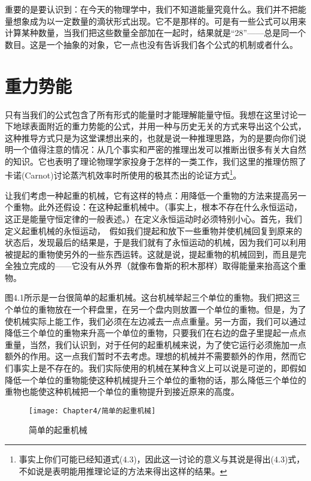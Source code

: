 重要的是要认识到：在今天的物理学中，我们不知道能量究竟什么。我们并不把能量想象成为以一定数量的滴状形式出现。它不是那样的。可是有一些公式可以用来计算某种数量，当我们把这些数量全部加在一起时，结果就是“28”——总是同一个数目。这是一个抽象的对象，它一点也没有告诉我们各个公式的机制或者什么。


\section{重力势能}

只有当我们的公式包含了所有形式的能量时才能理解能量守恒。我想在这里讨论一下地球表面附近的重力势能的公式，并用一种与历史无关的方式来导出这个公式，这种推导方式只是为这堂课想出来的，也就是说一种推理思路，为的是要向你们说明一个值得注意的情况：从几个事实和严密的推理出发可以推断出很多有关大自然的知识。它也表明了理论物理学家投身于怎样的一类工作，我们这里的推理仿照了卡诺(Carnot)讨论蒸汽机效率时所使用的极其杰出的论证方式\footnote{事实上你们可能已经知道式(4.3)，因此这一讨论的意义与其说是得出(4.3)式，不如说是表明能用推理论证的方法来得出这样的结果。}。

让我们考虑一种起重的机械，它有这样的特点：用降低一个重物的方法来提高另一个重物。此外还假设：在这种起重机械中。（事实上，根本不存在什么永恒运动，这正是能量守恒定律的一般表述。）在定义永恒运动时必须特别小心。首先，我们定义起重机械的永恒运动，　假如我们提起和放下一些重物并使机械回复到原来的状态后，发现最后的结果是，于是我们就有了永恒运动的机械，因为我们可以利用被提起的重物使另外的一些东西运转。这就是说，提起重物的机械回到，而且是完全独立完成的——它没有从外界（就像布鲁斯的积木那样）取得能量来抬高这个重物。

图4.1所示是一台很简单的起重机械。这台机械举起三个单位的重物。我们把这三个单位的重物放在一个秤盘里，在另一个盘内则放置一个单位的重物。但是，为了使机械实际上能工作，我们必须在左边减去一点点重量。另一方面，我们可以通过降低三个单位的重物来升高一个单位的重物，只要我们在右边的盘子里提起一点点重量，当然，我们认识到，对于任何的起重机械来说，为了使它运行必须施加一点额外的作用。这一点我们暂时不去考虑。理想的机械并不需要额外的作用，然而它们事实上是不存在的。我们实际使用的机械在某种含义上可以说是可逆的，即假如降低一个单位的重物能使这种机械提升三个单位的重物的话，那么降低三个单位的重物也能使这种机械把一个单位的重物提升到接近原来的高度。

\begin{wrapfigure}{r}{0.4\textwidth}
    \centering
    \texttt{[image: Chapter4/简单的起重机械]}
    \caption{简单的起重机械}
    \label{figure:简单的起重机械}
\end{wrapfigure}

